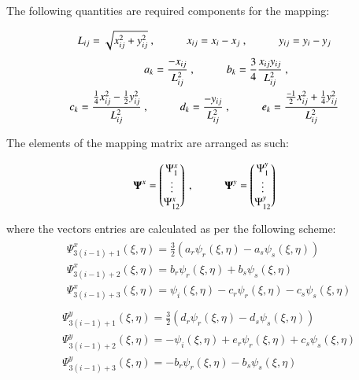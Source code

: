 The following quantities are required components for the mapping:

\begin{equation} 
L_{ij} = \sqrt{x_{ij}^2 + y_{ij}^2}\ ,
\hspace{10mm}
x_{ij} = x_i - x_j\ ,
\hspace{10mm}
y_{ij} = y_i - y_j
\label{equation22}
\end{equation}
\begin{gather} 
	\begin{aligned}
		&a_k = \frac{-x_{ij}}{L_{ij}^2}\ ,
		\hspace{10mm}
		b_k = \frac{3}{4} \frac{x_{ij} y_{ij}}{L_{ij}^2}\ , \\
		c_k = \frac{\frac{1}{4} x_{ij}^2 - \frac{1}{2} y_{ij}^2}{L_{ij}^2}\
		& ,
		\hspace{10mm}
		d_k = \frac{-y_{ij}}{L_{ij}^2}\ ,
		\hspace{10mm}
		e_k = \frac{\frac{-1}{2} x_{ij}^2 + \frac{1}{4} y_{ij}^2}{L_{ij}^2}
		\label{equation23}
	\end{aligned}
\end{gather}

The elements of the mapping matrix are arranged as such:

\begin{equation} 
\mathbf{\Psi}^x = 
\begin{pmatrix}
\Psi_1^x \\
\vdots \\
\Psi_{12}^x
\end{pmatrix}\ ,
\hspace{10mm}
\mathbf{\Psi}^y = 
\begin{pmatrix}
\Psi_1^y \\
\vdots \\
\Psi_{12}^y
\end{pmatrix}
\label{equation24}
\end{equation}

where the vectors entries are calculated as per the following scheme:
\begin{gather} 
	\begin{aligned}
		&\Psi_{3(i-1)+1}^x (\xi , \eta) = \frac{3}{2} (a_r \psi_r (\xi , \eta) - a_s \psi_s (\xi , \eta) ) \\
		&\Psi_{3(i-1)+2}^x (\xi , \eta) = b_r \psi_r (\xi , \eta) + b_s \psi_s (\xi , \eta) \\
		&\Psi_{3(i-1)+3}^x (\xi , \eta) = \psi_i (\xi , \eta) - c_r \psi_r (\xi , \eta) - c_s \psi_s (\xi , \eta)
		\label{equation25}
	\end{aligned}
\end{gather}
\begin{gather} 
	\begin{aligned}
		&\Psi_{3(i-1)+1}^y (\xi , \eta) = \frac{3}{2} (d_r \psi_r (\xi , \eta) - d_s \psi_s (\xi , \eta) ) \\
		&\Psi_{3(i-1)+2}^y (\xi , \eta) = -\psi_i (\xi , \eta) + e_r \psi_r (\xi , \eta) + c_s \psi_s (\xi , \eta) \\
		&\Psi_{3(i-1)+3}^y (\xi , \eta) = -b_r \psi_r (\xi , \eta) - b_s \psi_s (\xi , \eta)
		\label{equation26}
	\end{aligned}
\end{gather}

